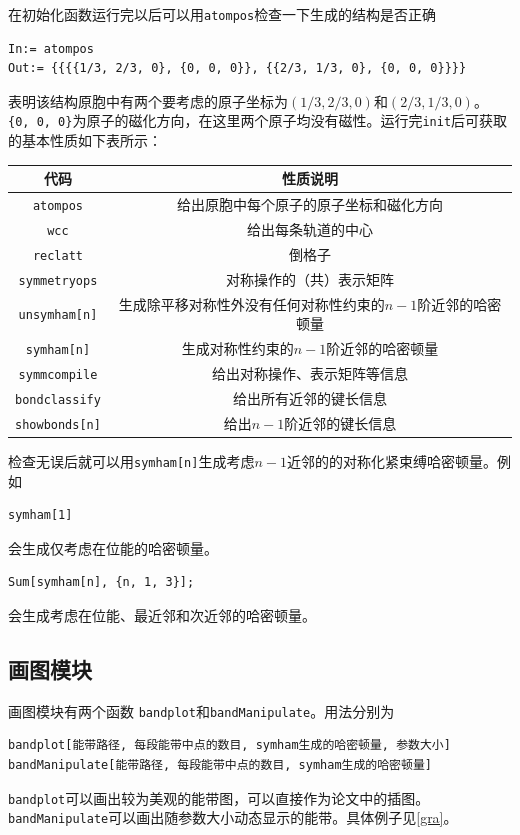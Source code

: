 \documentclass[titlepage,a4paper,12pt,AutoFakeBold]{article}
\begin{document}
在初始化函数运行完以后可以用\lstinline|atompos|检查一下生成的结构是否正确
\begin{lstlisting}
In:= atompos
Out:= {{{{1/3, 2/3, 0}, {0, 0, 0}}, {{2/3, 1/3, 0}, {0, 0, 0}}}}
\end{lstlisting}
表明该结构原胞中有两个要考虑的原子坐标为$(1/3,2/3,0)$和$(2/3,1/3,0)$。 \lstinline|{0, 0, 0}|为原子的磁化方向，在这里两个原子均没有磁性。运行完\lstinline!init!后可获取的基本性质如下表所示：
\begin{table}[ht]
	\centering
	\label{tab:pro} %
	\begin{tabular}{c|c}
		\hline 
		代码      & 性质说明 \tabularnewline
		\hline 
		\lstinline!atompos!  & 给出原胞中每个原子的原子坐标和磁化方向 \tabularnewline
		\hline 
		\lstinline!wcc!  & 给出每条轨道的中心 \tabularnewline
		\hline 
		\lstinline!reclatt!  & 倒格子 \tabularnewline
		\hline 
		\lstinline!symmetryops! & 对称操作的（共）表示矩阵 \tabularnewline
		\hline 
		\lstinline!unsymham[n]!  & 生成除平移对称性外没有任何对称性约束的$n-1$阶近邻的哈密顿量  \tabularnewline
		\hline
		\lstinline!symham[n]!  & 生成对称性约束的$n-1$阶近邻的哈密顿量  \tabularnewline
		\hline
		\lstinline!symmcompile!  & 给出对称操作、表示矩阵等信息 \tabularnewline
		\hline 
		\lstinline!bondclassify!  & 给出所有近邻的键长信息 \tabularnewline
		\hline
		\lstinline!showbonds[n]!  & 给出$n-1$阶近邻的键长信息 \tabularnewline
		\hline 
	\end{tabular}
\end{table}

检查无误后就可以用\lstinline|symham[n]|生成考虑$n-1$近邻的的对称化紧束缚哈密顿量。例如
\begin{lstlisting}[numbers=none]
   symham[1]
\end{lstlisting}
会生成仅考虑在位能的哈密顿量。
\begin{lstlisting}[numbers=none]
Sum[symham[n], {n, 1, 3}];
\end{lstlisting}
会生成考虑在位能、最近邻和次近邻的哈密顿量。


\subsection{画图模块}
画图模块有两个函数 \lstinline|bandplot|和\lstinline|bandManipulate|。用法分别为
\begin{lstlisting}[numbers=none]
bandplot[能带路径, 每段能带中点的数目, symham生成的哈密顿量, 参数大小]
bandManipulate[能带路径, 每段能带中点的数目, symham生成的哈密顿量]
\end{lstlisting}
\lstinline|bandplot|可以画出较为美观的能带图，可以直接作为论文中的插图。\lstinline|bandManipulate|可以画出随参数大小动态显示的能带。具体例子见\ref{gra}。
\end{document}
